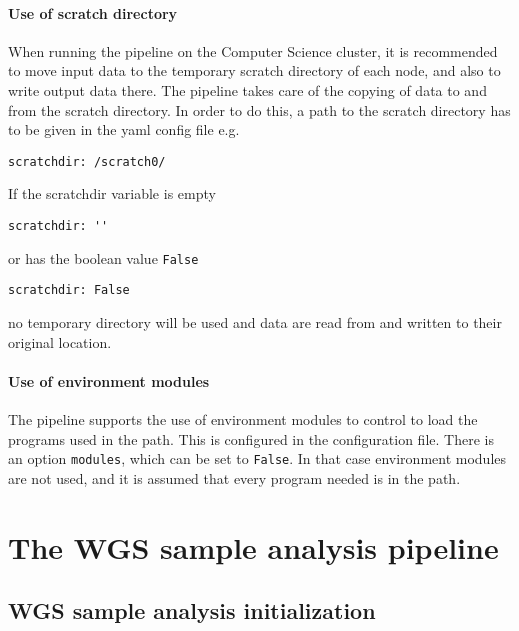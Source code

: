 \documentclass[a4paper]{article}
\begin{document}
\paragraph{Use of scratch directory}

When running the pipeline on the Computer Science cluster, it is
recommended to move input data to the temporary scratch directory of
each node, and also to write output data there. The pipeline takes
care of the copying of data to and from the scratch directory. In
order to do this, a path to the scratch directory has to be given in
the yaml config file e.g.

\begin{lstlisting}
scratchdir: /scratch0/
\end{lstlisting}

If the scratchdir variable is empty

\begin{lstlisting}
scratchdir: ''
\end{lstlisting}

or has the boolean value \texttt{False}

\begin{lstlisting}
scratchdir: False
\end{lstlisting}

no temporary directory will be used and data are read from and written
to their original location.

\paragraph{Use of environment modules}

The pipeline supports the use of environment modules to control to
load the programs used in the path. This is configured in the
configuration file. There is an option \texttt{modules}, which can be
set to \texttt{False}. In that case environment modules are not used,
and it is assumed that every program needed is in the path.

\section{The WGS sample analysis pipeline}
\label{sec:wgs-sample-analysis}

\subsection{WGS sample analysis initialization}
\label{sec:wgs-sample-analysis-1}
\end{document}
